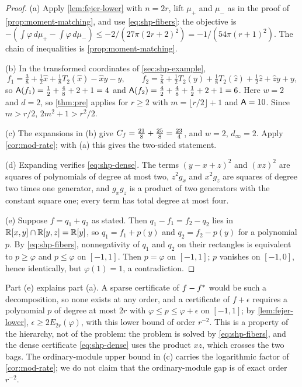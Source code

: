 \begin{proof}
(a) Apply \cref{lem:fejer-lower} with $n=2r$, lift $\mu_+$ and $\mu_-$ as
in the proof of \cref{prop:moment-matching}, and use \eqref{eq:shp-fibers}:
the objective is
$-(\int\varphi\,d\mu_+-\int\varphi\,d\mu_-)\le-2/(27\pi(2r+2)^2)=
-1/(54\pi(r+1)^2)$. The chain of inequalities is
\cref{prop:moment-matching}.

(b) In the transformed coordinates of \cref{sec:shp-example},
\[
  f_1=\tfrac38+\tfrac12\hat x+\tfrac18T_2(\hat x)-\hat xy-y,\qquad
  f_2=\tfrac78+\tfrac12T_2(y)+\tfrac18T_2(\hat z)+\tfrac12\hat z+\hat zy+y,
\]
so $\mathsf{A}(f_1)=\frac12+\frac48+2+1=4$ and
$\mathsf{A}(f_2)=\frac42+\frac48+\frac12+2+1=6$. Here $w=2$ and $d=2$, so
\cref{thm:pre} applies for $r\ge2$ with $m=\lfloor r/2\rfloor+1$ and
$\mathsf{A}=10$. Since $m>r/2$, $2m^2+1>r^2/2$.

(c) The expansions in (b) give $C_f=\frac{21}8+\frac{25}8=\frac{23}4$, and
$w=2$, $d_\infty=2$. Apply \cref{cor:mod-rate}; with (a) this gives the
two-sided statement.

(d) Expanding verifies \eqref{eq:shp-dense}. The terms $(y-x+z)^2$ and
$(xz)^2$ are squares of polynomials of degree at most two, $z^2g_x$ and
$x^2g_z$ are squares of degree two times one generator, and $g_xg_z$ is a
product of two generators with the constant square one; every term has
total degree at most four.

(e) Suppose $f=q_1+q_2$ as stated. Then $q_1-f_1=f_2-q_2$ lies in
$\mathbb{R}[x,y]\cap\mathbb{R}[y,z]=\mathbb{R}[y]$, so $q_1=f_1+p(y)$ and $q_2=f_2-p(y)$ for a
polynomial $p$. By \eqref{eq:shp-fibers}, nonnegativity of $q_1$ and $q_2$
on their rectangles is equivalent to $p\ge\varphi$ and $p\le\varphi$ on
$[-1,1]$. Then $p=\varphi$ on $[-1,1]$; $p$ vanishes on $[-1,0]$, hence
identically, but $\varphi(1)=1$, a contradiction.
\end{proof}

Part (e) explains part (a). A sparse certificate of $f-f^{*}$ would be
such a decomposition, so none exists at any order, and a certificate of
$f+\epsilon$ requires a polynomial $p$ of degree at most $2r$ with
$\varphi\le p\le\varphi+\epsilon$ on $[-1,1]$; by \cref{lem:fejer-lower},
$\epsilon\ge2E_{2r}(\varphi)$, with this lower bound of order $r^{-2}$.
This is a property of
the hierarchy, not of the problem: the problem is solved by
\eqref{eq:shp-fibers}, and the dense certificate \eqref{eq:shp-dense} uses
the product $xz$, which crosses the two bags. The ordinary-module upper
bound in (c) carries the logarithmic factor of \cref{cor:mod-rate}; we do
not claim that the ordinary-module gap is of exact order $r^{-2}$.

